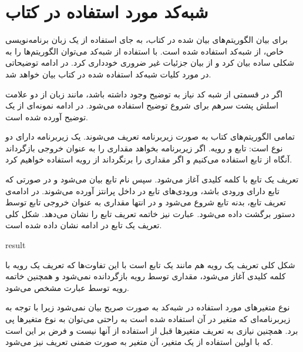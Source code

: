 \section*{شبه‌کد مورد استفاده در کتاب}

برای بیان الگوریتم‌های بیان شده در کتاب، به جای استفاده از یک زبان برنامه‌نویسی خاص، از شبه‌کد استفاده شده است. با استفاده از شبه‌کد می‌توان الگوریتم‌ها را به شکلی ساده بیان کرد و از بیان جزئیات غیر ضروری خودداری کرد. در ادامه توضیحاتی در مورد کلیات شبه‌کد استفاده شده در کتاب بیان خواهد شد.


اگر در قسمتی از شبه کد نیاز به توضیح وجود داشته باشد، مانند زبان {} از دو علامت اسلش پشت سرهم برای شروع توضیح استفاده می‌شود. در ادامه نمونه‌ای از یک توضیح آورده شده است.

\begin{latin}
\end{latin}


تمامی الگوریتم‌های کتاب به صورت زیربرنامه تعریف می‌شوند. یک زیربرنامه دارای دو نوع است: تابع و رویه. اگر زیربرنامه بخواهد مقداری را به عنوان خروجی بازگرداند آنگاه از تابع استفاده می‌کنیم و اگر مقداری را برنگرداند از رویه استفاده خواهیم کرد. 

تعریف یک تابع با کلمه کلیدی {} آغاز می‌شود. سپس نام تابع بیان می‌شود و در صورتی که تابع دارای ورودی باشد، ورودی‌های تابع در داخل پرانتز آورده می‌شوند. در ادامه‌ی تعریف تابع، بدنه تابع شروع می‌شود و در انتها مقداری به عنوان خروجی تابع توسط دستور {} برگشت داده می‌شود. عبارت {} نیز خاتمه تعریف تابع را نشان می‌دهد. شکل کلی تعریف یک تابع در ادامه نشان داده شده است.

\begin{latin}
\begin{algorithmic}[1]
	\State	{}
	\State	\Return result
\EndFunction
\end{algorithmic}
\end{latin}

شکل کلی تعریف یک رویه هم مانند یک تابع است با این تفاوت‌ها که تعریف یک رویه با کلمه کلیدی {} آغاز می‌شود، مقداری توسط رویه بازگردانده نمی‌شود و همچنین خاتمه رویه توسط عبارت {} مشخص می‌شود.


نوع متغیرهای مورد استفاده در شبه‌کد به صورت صریح بیان نمی‌شود زیرا با توجه به زیربرنامه‌‌ای که متغیر در آن استفاده شده است به راحتی می‌توان به نوع متغیرها پی برد. همچنین نیازی به تعریف متغیرها قبل از استفاده از آنها نیست و فرض بر این است که با اولین استفاده از یک متغیر، آن متغیر به صورت ضمنی تعریف نیز می‌شود.

